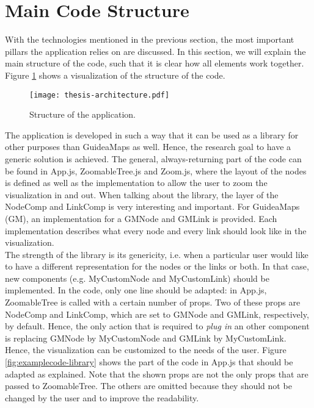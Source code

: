\section{Main Code Structure}\label{sec:structure}
With the technologies mentioned in the previous section, the most important pillars the application relies on are discussed. In this section, we will explain the main structure of the code, such that it is clear how all elements work together. Figure \ref{fig:overall-structure} shows a visualization of the structure of the code.
\begin{figure}[H]
	\centering
	\texttt{[image: thesis-architecture.pdf]}
	\caption{Structure of the application.}
	\label{fig:overall-structure}
\end{figure}

The application is developed in such a way that it can be used as a library for other purposes than GuideaMaps as well. Hence, the research goal to have a generic solution is achieved. The general, always-returning part of the code can be found in App.js, ZoomableTree.js and Zoom.js, where the layout of the nodes is defined as well as the implementation to allow the user to zoom the visualization in and out. When talking about the library, the layer of the NodeComp and LinkComp is very interesting and important. For GuideaMaps (GM), an implementation for a GMNode and GMLink is provided. Each implementation describes what every node and every link should look like in the visualization.\\

The strength of the library is its genericity, i.e. when a particular user would like to have a different representation for the nodes or the links or both. In that case, new components (e.g. MyCustomNode and MyCustomLink) should be implemented. In the code, only one line should be adapted: in App.js, ZoomableTree is called with a certain number of props. Two of these props are NodeComp and LinkComp, which are set to GMNode and GMLink, respectively, by default. Hence, the only action that is required to \textit{plug in} an other component is replacing GMNode by MyCustomNode and GMLink by MyCustomLink. Hence, the visualization can be customized to the needs of the user. Figure \ref{fig:examplecode-library} shows the part of the code in App.js that should be adapted as explained. Note that the shown props are not the only props that are passed to ZoomableTree. The others are omitted because they should not be changed by the user and to improve the readability.

